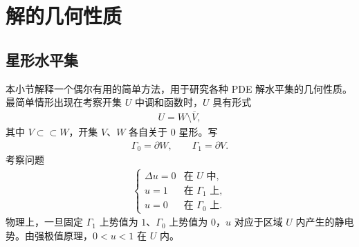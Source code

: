 \documentclass[../../main.tex]{subfiles}
\begin{document}
\section{解的几何性质}\label{section:ch09-5-解的几何性质}

\subsection{星形水平集}\label{subsection:ch09-5-1-星形水平集}

本小节解释一个偶尔有用的简单方法，用于研究各种 PDE 解水平集的几何性质。最简单情形出现在考察开集 $U$ 中调和函数时，$U$ 具有形式
\begin{align*}
U=W\setminus\overline{V},
\end{align*}
其中 $V\subset\subset W$，开集 $V$、$W$ 各自关于 $0$ 星形。写
\begin{align*}
\Gamma_0=\partial W,\qquad \Gamma_1=\partial V.
\end{align*}
考察问题
\begin{align}
\begin{cases}
\Delta u=0&\text{在 }U\text{ 中},\\
u=1&\text{在 }\Gamma_1\text{ 上},\\
u=0&\text{在 }\Gamma_0\text{ 上}.
\end{cases}\label{align:ch09-5-eq01}
\end{align}
物理上，一旦固定 $\Gamma_1$ 上势值为 $1$、$\Gamma_0$ 上势值为 $0$，$u$ 对应于区域 $U$ 内产生的静电势。由强极值原理，$0<u<1$ 在 $U$ 内。
\end{document}
